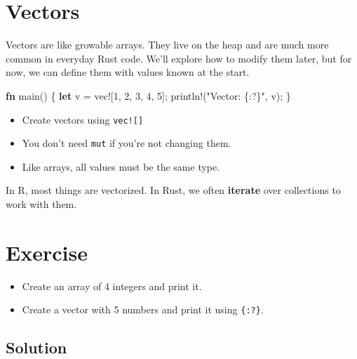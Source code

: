 \documentclass[
  letterpaper,
  DIV=11,
  numbers=noendperiod,
  oneside]{scrreprt}
\newenvironment{Shaded}{\begin{snugshade}}{\end{snugshade}}
\newcommand{\DecValTok}[1]{\textcolor[rgb]{0.68,0.00,0.00}{#1}}
\newcommand{\KeywordTok}[1]{\textcolor[rgb]{0.00,0.23,0.31}{\textbf{#1}}}
\newcommand{\NormalTok}[1]{\textcolor[rgb]{0.00,0.23,0.31}{#1}}
\newcommand{\OperatorTok}[1]{\textcolor[rgb]{0.37,0.37,0.37}{#1}}
\newcommand{\PreprocessorTok}[1]{\textcolor[rgb]{0.68,0.00,0.00}{#1}}
\newcommand{\StringTok}[1]{\textcolor[rgb]{0.13,0.47,0.30}{#1}}
\providecommand{\tightlist}{%
  \setlength{\itemsep}{0pt}\setlength{\parskip}{0pt}}\usepackage{longtable,booktabs,array}
\begin{document}
\section{Vectors}\label{vectors}

Vectors are like growable arrays. They live on the heap and are much
more common in everyday Rust code. We'll explore how to modify them
later, but for now, we can define them with values known at the start.

\begin{Shaded}
\begin{Highlighting}[]
\KeywordTok{fn}\NormalTok{ main() }\OperatorTok{\{}
    \KeywordTok{let}\NormalTok{ v }\OperatorTok{=} \PreprocessorTok{vec!}\NormalTok{[}\DecValTok{1}\OperatorTok{,} \DecValTok{2}\OperatorTok{,} \DecValTok{3}\OperatorTok{,} \DecValTok{4}\OperatorTok{,} \DecValTok{5}\NormalTok{]}\OperatorTok{;}
    \PreprocessorTok{println!}\NormalTok{(}\StringTok{"Vector: \{:?\}"}\OperatorTok{,}\NormalTok{ v)}\OperatorTok{;}
\OperatorTok{\}}
\end{Highlighting}
\end{Shaded}

\begin{itemize}
\tightlist
\item
  Create vectors using \texttt{vec!{[}{]}}
\item
  You don't need \texttt{mut} if you're not changing them.
\item
  Like arrays, all values must be the same type.
\end{itemize}

In R, most things are vectorized. In Rust, we often \textbf{iterate}
over collections to work with them.

\section{Exercise}\label{exercise-2}

\begin{itemize}
\tightlist
\item
  Create an array of 4 integers and print it.
\item
  Create a vector with 5 numbers and print it using \texttt{\{:?\}}.
\end{itemize}

\subsection{Solution}\label{solution-2}
\end{document}
